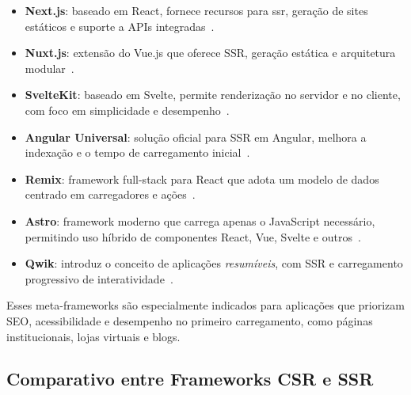 \begin{itemize}
    \item \textbf{Next.js}: baseado em React, fornece recursos para \acrshort{ssr}, geração de sites estáticos e suporte a APIs integradas~\cite{nextjs2024}.
    
    \item \textbf{Nuxt.js}: extensão do Vue.js que oferece SSR, geração estática e arquitetura modular~\cite{nuxtjs2024}.
    
    \item \textbf{SvelteKit}: baseado em Svelte, permite renderização no servidor e no cliente, com foco em simplicidade e desempenho~\cite{sveltekit2024}.
    
    \item \textbf{Angular Universal}: solução oficial para SSR em Angular, melhora a indexação e o tempo de carregamento inicial~\cite{angularuniversal2024}.
    
    \item \textbf{Remix}: framework full-stack para React que adota um modelo de dados centrado em carregadores e ações~\cite{remix2024}.
    
    \item \textbf{Astro}: framework moderno que carrega apenas o JavaScript necessário, permitindo uso híbrido de componentes React, Vue, Svelte e outros~\cite{astro2024}.
    
    \item \textbf{Qwik}: introduz o conceito de aplicações \textit{resumíveis}, com SSR e carregamento progressivo de interatividade~\cite{qwik2024}.
\end{itemize}

Esses meta-frameworks são especialmente indicados para aplicações que priorizam SEO, acessibilidade e desempenho no primeiro carregamento, como páginas institucionais, lojas virtuais e blogs.

\subsection{Comparativo entre Frameworks CSR e SSR}
\label{subsec:comparativo-frameworks}

